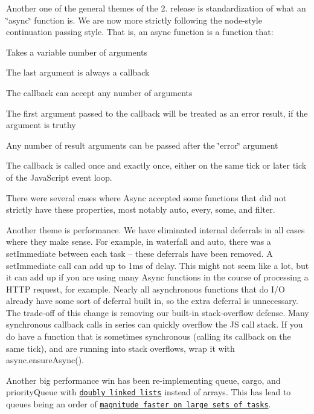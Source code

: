 Another one of the general themes of the 2. release is standardization of what an \char`\"{}async\char`\"{} function is. We are now more strictly following the node-\/style continuation passing style. That is, an async function is a function that\+:


\begin{DoxyEnumerate}
\item Takes a variable number of arguments
\item The last argument is always a callback
\item The callback can accept any number of arguments
\item The first argument passed to the callback will be treated as an error result, if the argument is truthy
\item Any number of result arguments can be passed after the \char`\"{}error\char`\"{} argument
\item The callback is called once and exactly once, either on the same tick or later tick of the Java\+Script event loop.
\end{DoxyEnumerate}

There were several cases where Async accepted some functions that did not strictly have these properties, most notably {\ttfamily auto}, {\ttfamily every}, {\ttfamily some}, and {\ttfamily filter}.

Another theme is performance. We have eliminated internal deferrals in all cases where they make sense. For example, in {\ttfamily waterfall} and {\ttfamily auto}, there was a {\ttfamily set\+Immediate} between each task -- these deferrals have been removed. A {\ttfamily set\+Immediate} call can add up to 1ms of delay. This might not seem like a lot, but it can add up if you are using many Async functions in the course of processing a H\+T\+TP request, for example. Nearly all asynchronous functions that do I/O already have some sort of deferral built in, so the extra deferral is unnecessary. The trade-\/off of this change is removing our built-\/in stack-\/overflow defense. Many synchronous callback calls in series can quickly overflow the JS call stack. If you do have a function that is sometimes synchronous (calling its callback on the same tick), and are running into stack overflows, wrap it with {\ttfamily async.\+ensure\+Async()}.

Another big performance win has been re-\/implementing {\ttfamily queue}, {\ttfamily cargo}, and {\ttfamily priority\+Queue} with \href{https://en.wikipedia.org/wiki/Doubly_linked_list}{\tt doubly linked lists} instead of arrays. This has lead to queues being an order of \href{https://github.com/caolan/async/pull/1205}{\tt magnitude faster on large sets of tasks}.

